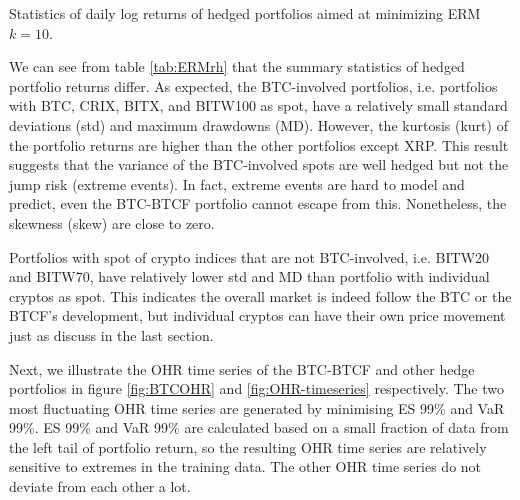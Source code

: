 \begin{table}[t!]

\caption{Statistics of daily log returns  of hedged portfolios aimed at minimizing ERM $k=10$.}
\label{tab:ERMrh}
\end{table}

We can see from table \ref{tab:ERMrh} that the summary statistics of hedged portfolio returns differ.
As expected, the BTC-involved portfolios, i.e. portfolios with BTC, CRIX, BITX, and BITW100 as spot, have a relatively small
standard deviations (std) and maximum drawdowns (MD).
However, the kurtosis (kurt) of the portfolio returns are higher than the other portfolios except XRP.
This result suggests that the variance of the BTC-involved spots are well hedged but not the jump risk (extreme events).
In fact, extreme events are hard to model and predict, even the BTC-BTCF portfolio cannot escape from this.
Nonetheless, the skewness (skew) are close to zero. \medskip

Portfolios with spot of crypto indices that are not BTC-involved, i.e. BITW20 and BITW70, have relatively lower std and MD than portfolio with individual cryptos as spot.
This indicates the overall market is indeed follow the BTC or the BTCF's development, but individual cryptos can have their own price movement just as discuss in the last section. \medskip

Next, we illustrate the OHR time series of the BTC-BTCF and other hedge portfolios in figure \ref{fig:BTCOHR} and \ref{fig:OHR-timeseries} respectively.
The two most fluctuating OHR time series are generated by minimising ES 99\% and VaR 99\%.
ES 99\% and VaR 99\% are calculated based on a small fraction of data from the left tail of portfolio return,
so the resulting OHR time series are relatively sensitive to extremes in the training data.
The other OHR time series do not deviate from each other a lot. \medskip

